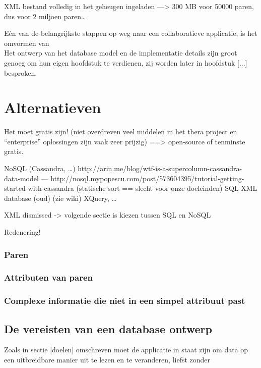 

XML bestand volledig in het geheugen ingeladen ---> 300 MB voor 50000 paren, dus voor 2 miljoen paren\ldots

E\'en van de belangrijkste stappen op weg naar een collaboratieve applicatie, is het omvormen van\\

Het ontwerp van het database model en de implementatie details zijn groot genoeg om hun eigen hoofdstuk te verdienen, zij worden later in hoofdstuk [...] besproken.\\

\section{Alternatieven}
Het moet gratis zijn! (niet overdreven veel middelen in het thera project en ``enterprise'' oplossingen zijn vaak zeer prijzig) ==> open-source of tenminste gratis.

NoSQL (Cassandra, \ldots) http://arin.me/blog/wtf-is-a-supercolumn-cassandra-data-model --- http://nosql.mypopescu.com/post/573604395/tutorial-getting-started-with-cassandra (statische sort == slecht voor onze doeleinden)
SQL
XML database (oud) (zie wiki) XQuery, \ldots

XML dismissed -> volgende sectie is kiezen tussen SQL en NoSQL

Redenering!

\subsubsection{Paren}

\subsubsection{Attributen van paren}

\subsubsection{Complexe informatie die niet in een simpel attribuut past}

\subsection{De vereisten van een database ontwerp}
Zoals in sectie [doelen] omschreven moet de applicatie in staat zijn om data op een uitbreidbare manier uit te lezen en te veranderen, liefst zonder 

